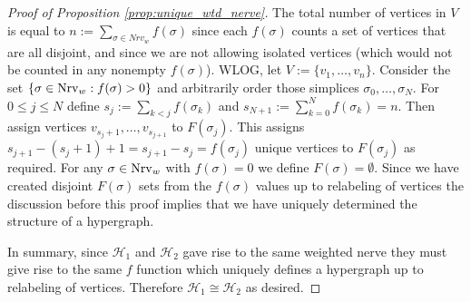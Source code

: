 \documentclass{amsart}
\renewcommand{\H}{\mathcal{H}}
\newcommand{\Nrv}{\mm{\mathrm{Nrv}}}
\newcommand {\mm}[1]        {\ifmmode{#1}\else{\mbox{\(#1\)}}\fi}
\newcommand{\cEP}[1]{{\textcolor{blue}{[Comment from Emilie: #1]}}}
\begin{document}
\begin{proof}[Proof of Proposition \ref{prop:unique_wtd_nerve}]
    The total number of vertices in $V$ is equal to $n := \sum_{\sigma \in Nrv_w} f(\sigma)$ since each $f(\sigma)$ counts a set of vertices that are all disjoint, and since we are not allowing isolated vertices (which would not be counted in any nonempty $f(\sigma)$).
    WLOG, let $V := \{v_1, \ldots, v_n\}$. 
    Consider the set $\{\sigma \in \Nrv_w : f(\sigma) > 0\}$ and arbitrarily order those simplices $\sigma_0, \ldots, \sigma_N$.
    For $0\leq j \leq N$ define $s_j := \sum_{k < j} f(\sigma_k)$ and $s_{N+1} := \sum_{k=0}^N f(\sigma_k) = n$.
    Then assign vertices $v_{s_j+1}, \ldots, v_{s_{j+1}}$ to $F(\sigma_j)$. This assigns $s_{j+1} - (s_{j}+1)+1 = s_{j+1}-s_j = f(\sigma_j)$ unique vertices to $F(\sigma_j)$ as required. For any $\sigma \in \Nrv_w$ with $f(\sigma)=0$ we define $F(\sigma)=\emptyset$. 
    Since we have created disjoint $F(\sigma)$ sets from the $f(\sigma)$ values up to relabeling of vertices the discussion before this proof implies that we have uniquely determined the structure of a hypergraph.
    
    In summary, since $\H_1$ and $\H_2$ gave rise to the same weighted nerve they must give rise to the same $f$ function which uniquely defines a hypergraph up to relabeling of vertices. Therefore $\H_1 \cong \H_2$ as desired.
\end{proof}

\end{document}
